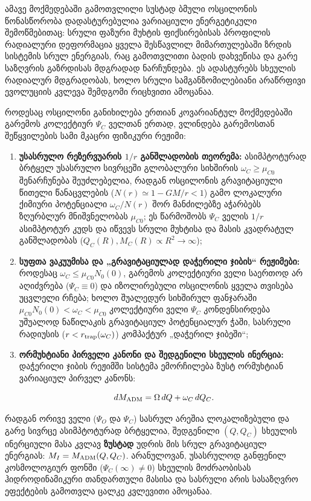 \documentclass[11pt,a4paper]{article}
\begin{document}
ამავე მოქმედებაში გამოთვლილი სუსტად ბმული ოსცილონის წონასწორობა დადასტურებულია ვარიაციული ენერგეტიკული შემოწმებითაც: სრული ფაზური მუხტის ფიქსირებისას პროფილის რადიალური დეფორმაცია ყველა შესწავლილ მიმართულებაში ზრდის სისტემის სრულ ენერგიას, რაც გამოთვლითი ბადის დახვეწისა და გარე საზღვრის გაზრდისას მდგრადად ნარჩუნდება. ეს ადასტურებს სხეულის რადიალურ მდგრადობას, ხოლო სრული სამგანზომილებიანი არაწრფივი ევოლუციის კვლევა შემდგომი რიცხვითი ამოცანაა.

როდესაც ოსცილონი განიხილება ერთიან კოვარიანტულ მოქმედებაში გარემოს კოლექტიურ $\Psi_C$ ველთან ერთად, ვლინდება გარემოსთან შეწყვილების სამი მკაცრი ფიზიკური რეჟიმი:

\begin{enumerate}[label=\arabic*.]
\item \textbf{უსასრულო რეზერვუარის $1/r$ განშლადობის თეორემა:} ასიმპტოტურად ბრტყელ უსასრულო სივრცეში გლობალური სიხშირის $\omega_C \ge \mu_{C0}$ შენარჩუნება შეუძლებელია, რადგან ოსცილონის გრავიტაციული წითელი წანაცვლების ($N(r) \simeq 1 - GM/r < 1$) გამო ლოკალური ქიმიური პოტენციალი $\omega_C/N(r)$ შორ მანძილებზე აჭარბებს ზღურბლურ მნიშვნელობას $\mu_{C0}$; ეს წარმოშობს $\Psi_C$ ველის $1/r$ ასიმპტოტურ კუდს და იწვევს სრული მუხტისა და მასის კვადრატულ განშლადობას ($Q_C(R), M_C(R) \propto R^2 \to \infty$);
\item \textbf{სუფთა ვაკუუმისა და „გრავიტაციულად დაჭერილი ჯიბის“ რეჟიმები:} როდესაც $\omega_C \le \mu_{C0} N_0(0)$, გარემოს კოლექტიური ველი საერთოდ არ აღიძვრება ($\Psi_C \equiv 0$) და იზოლირებული ოსცილონის ყველა თვისება უცვლელი რჩება; ხოლო შუალედურ სიხშირულ ფანჯარაში $\mu_{C0} N_0(0) < \omega_C < \mu_{C0}$ კოლექტიური ველი $\Psi_C$ კონდენსირდება უშუალოდ ნაწილაკის გრავიტაციულ პოტენციალურ ჭაში, სასრული რადიუსის ($r < r_{\rm trap}(\omega_C)$) კომპაქტურ „დაჭერილ ჯიბეში“;
\item \textbf{ორმუხტიანი პირველი კანონი და შედგენილი სხეულის ინერცია:} დაჭერილი ჯიბის რეჟიმში სისტემა ემორჩილება ზუსტ ორმუხტიან ვარიაციულ პირველ კანონს:

\[
dM_{\rm ADM} = \Omega\,dQ + \omega_C\,dQ_C.
\]

\end{enumerate}
რადგან ორივე ველი ($\Psi_O$ და $\Psi_C$) სასრულ არეშია ლოკალიზებული და გარე სივრცე ასიმპტოტურად ბრტყელია, შედგენილი $(Q, Q_C)$ სხეულის ინერციული მასა კვლავ \textbf{ზუსტად} უდრის მის სრულ გრავიტაციულ ენერგიას: $M_I = M_{\rm ADM}(Q, Q_C)$. არანულოვან, უსასრულოდ განფენილ კოსმოლოგიურ ფონში ($\Psi_C(\infty) \neq 0$) სხეულის მოძრაობისას ჰიდროდინამიკური თანდართული მასისა და სასრული არის სასაზღვრო ეფექტების გამოთვლა ცალკე კვლევითი ამოცანაა.
\end{document}
